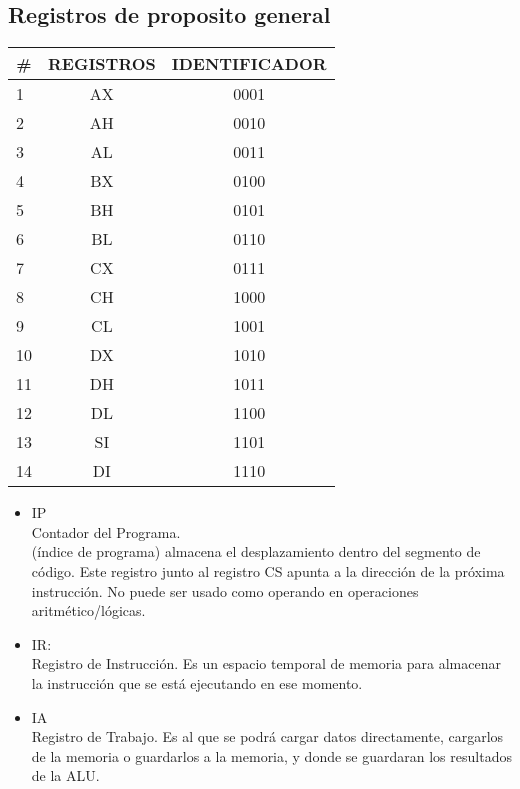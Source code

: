 \documentclass[conference]{IEEEtran}
\begin{document}
        \subsection{Registros de proposito general}
        \begin{table}[h]
            \begin{tabular}{|l|c|c|}
            \hline
            \multicolumn{1}{|c|}{\#} & REGISTROS & IDENTIFICADOR \\ \hline
            1                        & AX        & 0001          \\ \hline
            2                        & AH        & 0010          \\ \hline
            3                        & AL        & 0011          \\ \hline
            4                        & BX        & 0100          \\ \hline
            5                        & BH        & 0101          \\ \hline
            6                        & BL        & 0110          \\ \hline
            7                        & CX        & 0111          \\ \hline
            8                        & CH        & 1000          \\ \hline
            9                        & CL        & 1001          \\ \hline
            10                       & DX        & 1010          \\ \hline
            11                       & DH        & 1011          \\ \hline
            12                       & DL        & 1100          \\ \hline
            13                       & SI        & 1101          \\ \hline
            14                       & DI        & 1110          \\ \hline
            \end{tabular}
            \end{table}
\begin{itemize}
    \item IP \\
    Contador del Programa. \\
    (índice de programa) almacena el desplazamiento dentro del segmento de código. Este registro
    junto al registro CS apunta a la dirección de la próxima instrucción. No puede ser usado como
    operando en operaciones aritmético/lógicas. 
    \item IR: \\
    Registro de Instrucción. 
    Es un espacio temporal de memoria para
    almacenar la instrucción que se está ejecutando en
    ese momento.
    \item IA\\ Registro de Trabajo. 
    Es al que se podrá cargar datos directamente, cargarlos de la
    memoria o guardarlos a la memoria, y donde se
    guardaran los resultados de la ALU.

\end{itemize}
\end{document}
